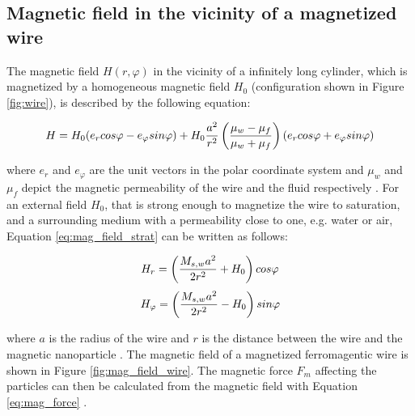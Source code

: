\subsection{Magnetic field in the vicinity of a magnetized wire}
\label{subsec:mag_field}
The magnetic field $H(r,\varphi)$ in the vicinity of a infinitely long cylinder, which is magnetized by a homogeneous magnetic field $H_{0}$ (configuration shown in Figure \ref{fig:wire}), is described by the following equation:

\begin{equation}
\label{eq:mag_field_strat}
\centering
H = H_{0}(e_{r}cos\varphi-e_{\varphi}sin\varphi)+H_{0}\frac{a^{2}}{r^{2}}\left(\frac{\mu_{w}-\mu_{f}}{\mu_{w}+\mu_{f}}\right)(e_{r}cos\varphi+e_{\varphi}sin\varphi)
\end{equation}

where $e_{r}$ and $e_{\varphi}$ are the unit vectors in the polar coordinate system and $\mu_{w}$ and $\mu_{f}$ depict the magnetic permeability of the wire and the fluid respectively \cite{stratton2007electromagnetic}. For an external field $H_{0}$, that is strong enough to magnetize the wire to saturation, and a surrounding medium with a permeability close to one, e.g. water or air, Equation \ref{eq:mag_field_strat} can be written as follows:

\begin{equation}
\label{eq:Hr_field}
\centering
H_{r} = \left(\frac{M_{s,w}a^{2}}{2r^{2}}+H_{0}\right)cos\varphi
\end{equation}
\begin{equation}
\label{eq:Hphi_field}
\centering
H_{\varphi} = \left(\frac{M_{s,w}a^{2}}{2r^{2}}-H_{0}\right)sin\varphi
\end{equation}

where $a$ is the radius of the wire and $r$ is the distance between the wire and the magnetic nanoparticle \cite{FranzrebHabil}. The magnetic field of a magnetized ferromagentic wire is shown in Figure \ref{fig:mag_field_wire}. The magnetic force $F_{m}$ affecting the particles can then be calculated from the magnetic field with Equation \ref{eq:mag_force} \cite{moeser2004high}. 

